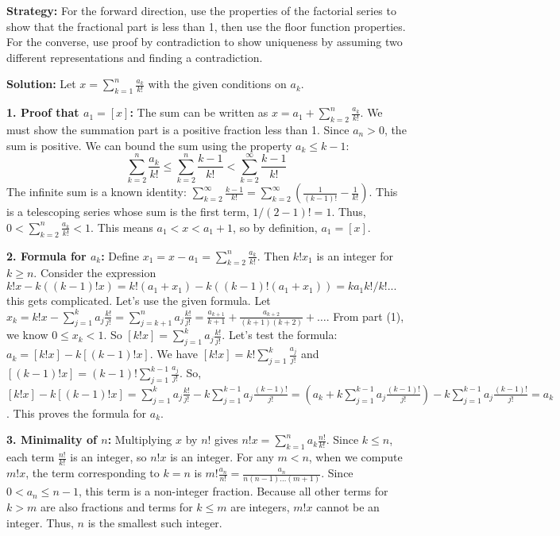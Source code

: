 \noindent\textbf{Strategy:} For the forward direction, use the properties of the factorial series to show that the fractional part is less than 1, then use the floor function properties. For the converse, use proof by contradiction to show uniqueness by assuming two different representations and finding a contradiction.

\bigskip\noindent\textbf{Solution:}
Let $x = \sum_{k=1}^n \frac{a_k}{k!}$ with the given conditions on $a_k$.

\textbf{1. Proof that $a_1 = [x]$:}
The sum can be written as $x = a_1 + \sum_{k=2}^n \frac{a_k}{k!}$. We must show the summation part is a positive fraction less than 1. Since $a_n > 0$, the sum is positive. We can bound the sum using the property $a_k \leq k-1$:
\[
\sum_{k=2}^n \frac{a_k}{k!} \leq \sum_{k=2}^n \frac{k-1}{k!} < \sum_{k=2}^{\infty} \frac{k-1}{k!}
\]
The infinite sum is a known identity: $\sum_{k=2}^{\infty} \frac{k-1}{k!} = \sum_{k=2}^{\infty} \left(\frac{1}{(k-1)!} - \frac{1}{k!}\right)$. This is a telescoping series whose sum is the first term, $1/(2-1)! = 1$.
Thus, $0 < \sum_{k=2}^n \frac{a_k}{k!} < 1$. This means $a_1 < x < a_1 + 1$, so by definition, $a_1 = [x]$.

\textbf{2. Formula for $a_k$:}
Define $x_1 = x - a_1 = \sum_{k=2}^n \frac{a_k}{k!}$. Then $k!x_1$ is an integer for $k \ge n$.
Consider the expression $k!x - k((k-1)!x) = k!(a_1+x_1) - k((k-1)!(a_1+x_1)) = ka_1k!/k! ...$ this gets complicated.
Let's use the given formula. Let $x_k = k!x - \sum_{j=1}^{k} a_j \frac{k!}{j!} = \sum_{j=k+1}^{n} a_j \frac{k!}{j!} = \frac{a_{k+1}}{k+1} + \frac{a_{k+2}}{(k+1)(k+2)} + \dots$.
From part (1), we know $0 \le x_k < 1$. So $[k!x] = \sum_{j=1}^{k} a_j \frac{k!}{j!}$.
Let's test the formula: $a_k = [k!x] - k[(k - 1)!x]$.
We have $[k!x] = k! \sum_{j=1}^k \frac{a_j}{j!}$ and $[(k-1)!x] = (k-1)! \sum_{j=1}^{k-1} \frac{a_j}{j!}$.
So, $[k!x] - k[(k-1)!x] = \sum_{j=1}^k a_j \frac{k!}{j!} - k \sum_{j=1}^{k-1} a_j \frac{(k-1)!}{j!} = \left(a_k + k\sum_{j=1}^{k-1} a_j \frac{(k-1)!}{j!}\right) - k\sum_{j=1}^{k-1} a_j \frac{(k-1)!}{j!} = a_k$.
This proves the formula for $a_k$.

\textbf{3. Minimality of $n$:}
Multiplying $x$ by $n!$ gives $n!x = \sum_{k=1}^n a_k \frac{n!}{k!}$. Since $k \le n$, each term $\frac{n!}{k!}$ is an integer, so $n!x$ is an integer.
For any $m < n$, when we compute $m!x$, the term corresponding to $k=n$ is $m! \frac{a_n}{n!} = \frac{a_n}{n(n-1)\dots(m+1)}$. Since $0 < a_n \le n-1$, this term is a non-integer fraction. Because all other terms for $k>m$ are also fractions and terms for $k\le m$ are integers, $m!x$ cannot be an integer. Thus, $n$ is the smallest such integer.

